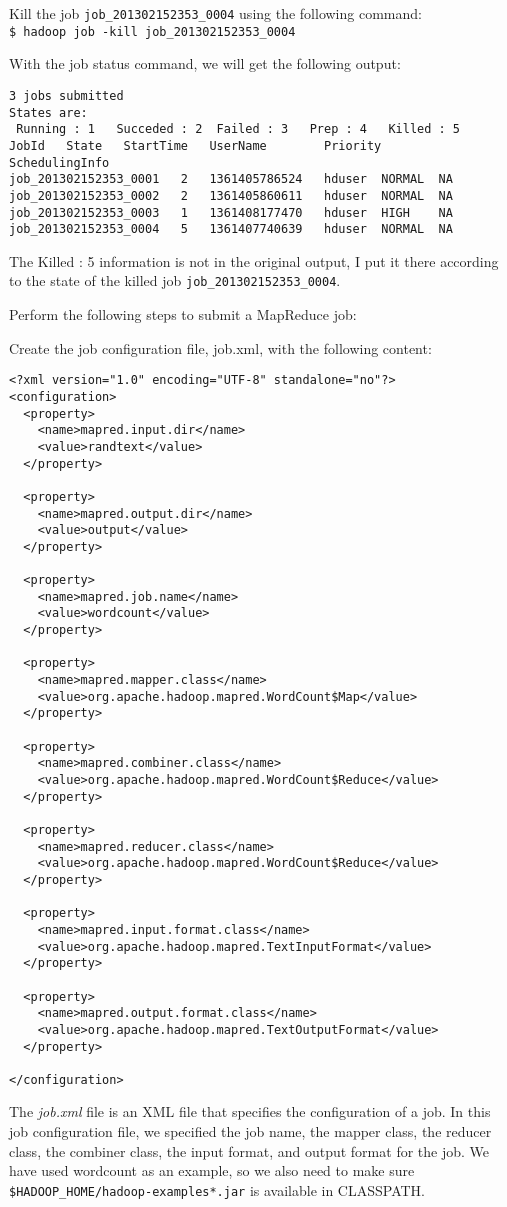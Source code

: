 Kill the job \verb|job_201302152353_0004| using the following command: \\
\verb|$ hadoop job -kill job_201302152353_0004|

With the job status command, we will get the following output:
\begin{verbatim}
3 jobs submitted
States are:
 Running : 1   Succeded : 2  Failed : 3   Prep : 4   Killed : 5
JobId   State   StartTime   UserName        Priority        SchedulingInfo
job_201302152353_0001   2   1361405786524   hduser  NORMAL  NA
job_201302152353_0002   2   1361405860611   hduser  NORMAL  NA
job_201302152353_0003   1   1361408177470   hduser  HIGH    NA
job_201302152353_0004   5   1361407740639   hduser  NORMAL  NA
\end{verbatim}

\begin{info}
The Killed : 5 information is not in the original output, I put it there according to the state of the killed job \verb|job_201302152353_0004|.
\end{info}

Perform the following steps to submit a MapReduce job:

Create the job configuration file, job.xml, with the following content:
\begin{verbatim}
<?xml version="1.0" encoding="UTF-8" standalone="no"?>
<configuration>
  <property>
    <name>mapred.input.dir</name>
    <value>randtext</value>
  </property>

  <property>
    <name>mapred.output.dir</name>
    <value>output</value>
  </property>

  <property>
    <name>mapred.job.name</name>
    <value>wordcount</value>
  </property>

  <property>
    <name>mapred.mapper.class</name>
    <value>org.apache.hadoop.mapred.WordCount$Map</value>
  </property>

  <property>
    <name>mapred.combiner.class</name>
    <value>org.apache.hadoop.mapred.WordCount$Reduce</value>
  </property>

  <property>
    <name>mapred.reducer.class</name>
    <value>org.apache.hadoop.mapred.WordCount$Reduce</value>
  </property>

  <property>
    <name>mapred.input.format.class</name>
    <value>org.apache.hadoop.mapred.TextInputFormat</value>
  </property>

  <property>
    <name>mapred.output.format.class</name>
    <value>org.apache.hadoop.mapred.TextOutputFormat</value>
  </property>

</configuration>
\end{verbatim}
The \emph{job.xml} file is an XML file that specifies the configuration of a job. In this job configuration file, we specified the job name, the mapper class, the reducer class, the combiner class, the input format, and output format for the job. We have used wordcount as an example, so we also need to make sure \verb|$HADOOP_HOME/hadoop-examples*.jar| is available in CLASSPATH.

